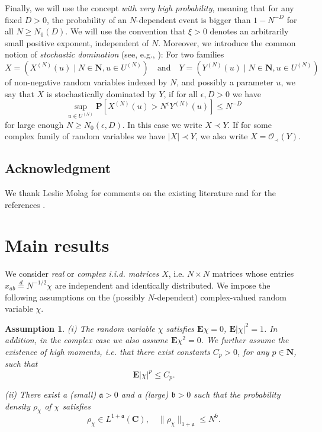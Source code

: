 \documentclass[10pt]{amsart}
\newtheorem{assumption}[theorem]{Assumption}
\numberwithin{equation}{section}
\newcommand{\E}{\mathbf{E}}
\newcommand{\C}{\mathbf{C}}
\newcommand{\N}{\mathbf{N}}
\begin{document}
Finally, we will use the concept  \emph{with very high probability},  meaning that for any fixed $D > 0$, the probability of an $N$-dependent event is bigger than $1 - N^{-D}$ for all $N \ge N_0(D)$. We will use the convention that $\xi > 0$ denotes an arbitrarily small positive exponent, independent of $N$. Moreover, we introduce the common notion of \emph{stochastic domination} (see, e.g., \cite{loc_sc_gen}): For two families
\begin{equation*}
	X = \left(X^{(N)}(u) \mid N \in \N, u \in U^{(N)}\right) \quad \text{and} \quad Y = \left(Y^{(N)}(u) \mid N \in \N, u \in U^{(N)}\right)
\end{equation*}
of non-negative random variables indexed by $N$, and possibly a parameter $u$, we say that $X$ is stochastically dominated by $Y$, if for all $\epsilon, D >0$ we have 
\begin{equation*}
	\sup_{u \in U^{(N)}} \mathbf{P} \left[X^{(N)}(u) > N^\epsilon Y^{(N)}(u)\right] \le N^{-D}
\end{equation*}
for large enough $N \ge N_0(\epsilon, D)$. In this case we write $X \prec Y$. If for some complex family of random variables we have $\vert X \vert \prec Y$, we also write $X = \mathcal{O}_\prec(Y)$. 

\subsection*{Acknowledgment} We thank Leslie Molag for comments on the existing literature and for the references \cite{norm_rep,fluct_norm_mat26, Weierstr_zeta23}.


\section{Main results}

We consider \emph{real} or \emph{complex i.i.d. matrices $X$}, i.e. $N\times N$ matrices whose entries $x_{ab}\stackrel{d}{=}N^{-1/2}\chi$ are independent and identically distributed. We impose the following assumptions on the (possibly $N$-dependent) complex-valued random variable $\chi$.
\begin{assumption}\label{ass:chi} \emph{(i)} The random variable $\chi$ satisfies $\E \chi=0$, $\E |\chi|^2=1$. In addition, in the complex case we also assume $\E\chi^2=0$. We further assume the existence of high moments, i.e. that there exist constants $C_p>0$, for any $p\in \N$, such that  
\begin{equation}
\E |\chi|^p\le C_p.
\label{eq:momass}
\end{equation}

\noindent\emph{(ii)} There exist a (small) $\mathfrak{a}>0$ and a (large) $\mathfrak{b}>0$ such that the probability density $\rho_\chi$ of $\chi$
satisfies
\begin{equation}
\rho_\chi \in L^{1+\mathfrak{a}}(\C),\quad \|\rho_\chi\|_{1+\mathfrak{a}}\le N^\mathfrak{b}.
\label{eq:reg_ass}
\end{equation}
\end{assumption}
\end{document}
